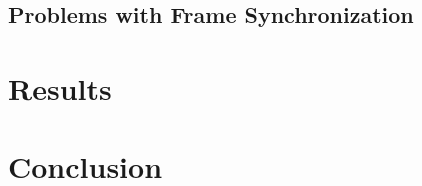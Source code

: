 \documentclass[journal, onecolumn]{IEEEtran}
\begin{document}
\subsection{Problems with Frame Synchronization}

\section{Results}

\section{Conclusion}







\end{document}
